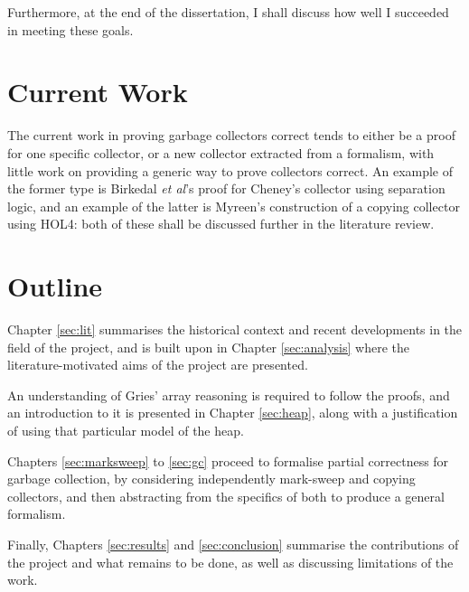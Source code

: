Furthermore, at the end of the dissertation, I shall discuss how well
I succeeded in meeting these goals.

\section{Current Work}
\label{sec:intro-current}

The current work in proving garbage collectors correct tends to either
be a proof for one specific collector, or a new collector extracted
from a formalism, with little work on providing a generic way to prove
collectors correct. An example of the former type is Birkedal
\textit{et al}'s\cite{Birkedal04} proof for Cheney's collector using
separation logic, and an example of the latter is
Myreen's\cite{Myreen10} construction of a copying collector using
HOL4: both of these shall be discussed further in the literature
review.

\section{Outline}
\label{sec:intro-outline}

Chapter \ref{sec:lit} summarises the historical context and recent
developments in the field of the project, and is built upon in Chapter
\ref{sec:analysis} where the literature-motivated aims of the project
are presented.

An understanding of Gries' array reasoning\cite{Gries87} is required
to follow the proofs, and an introduction to it is presented in
Chapter \ref{sec:heap}, along with a justification of using that
particular model of the heap.

Chapters \ref{sec:marksweep} to \ref{sec:gc} proceed to formalise
partial correctness for garbage collection, by considering
independently mark-sweep and copying collectors, and then abstracting
from the specifics of both to produce a general formalism.

Finally, Chapters \ref{sec:results} and \ref{sec:conclusion} summarise
the contributions of the project and what remains to be done, as well
as discussing limitations of the work.
